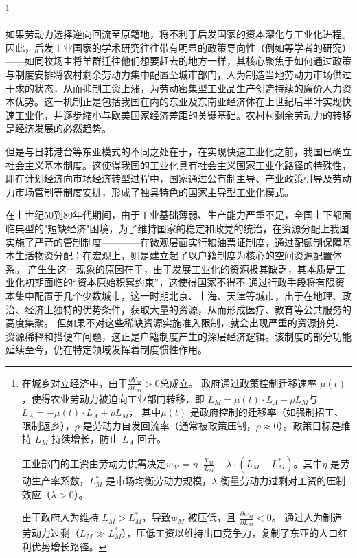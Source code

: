 \documentclass[a4paper, zihao=-4, fontset = mac, oneside]{ctexbook} %
\let\oldfootnote\footnote
\renewcommand{\footnote}[1]{%
  \oldfootnote{\setstretch{1.5}#1}%
}
\begin{document}
\footnote{
  在城乡对立经济中，由于\(\frac{\partial Y_M}{\partial L_M}>0\)总成立。
  政府通过政策控制迁移速率 \( \mu(t) \)，使得农业劳动力被迫向工业部门转移，即
  \(\dot{L}_M = \mu(t) \cdot L_A - \rho L_M\)与\(\dot{L}_A = -\mu(t) \cdot L_A + \rho L_M\)，
  其中\( \mu(t) \) 是政府控制的迁移率（如强制招工、限制返乡），\( \rho \) 是劳动力自发回流率（通常被政策压制，\( \rho \approx 0 \)）。政策目标是维持 \( L_M \) 持续增长，防止 \( L_A \) 回升。

  工业部门的工资由劳动力供需决定\(w_M = \eta \cdot \frac{Y_M}{L_M}  - \lambda \cdot (L_M - L_M^*)\)。其中\( \eta \) 是劳动生产率系数，\( L_M^* \) 是市场均衡劳动力规模，\( \lambda \) 衡量劳动力过剩对工资的压制效应（\( \lambda > 0 \)）。

  由于政府人为维持 \( L_M > L_M^* \)，导致\(w_M \text{ 被压低，且 } \frac{\partial w_M}{\partial L_M} < 0\)。
  通过人为制造劳动力过剩（\( L_M \gg L_M^* \)），压低工资以维持出口竞争力，复制了东亚的人口红利优势增长路径。
}
如果劳动力选择逆向回流至原籍地，将不利于后发国家的资本深化与工业化进程。
因此，后发工业国家的学术研究往往带有明显的政策导向性（例如\textcite{QuanZhuoWeiWoGuoNongCunShengYuLaoDongLiZhuanYiDeYanJiu1996}等学者的研究）——如同牧场主将羊群迁往他们想要赶去的地方一样，其核心聚焦于如何通过政策与制度安排将农村剩余劳动力集中配置至城市部门，人为制造当地劳动力市场供过于求的状态，从而抑制工资上涨，为劳动密集型工业品生产创造持续的廉价人力资本优势。这一机制正是包括我国在内的东亚及东南亚经济体在上世纪后半叶实现快速工业化，并逐步缩小与欧美国家经济差距的关键基础。农村村剩余劳动力的转移是经济发展的必然趋势。

但是与日韩港台等东亚模式的不同之处在于，在实现快速工业化之前，我国已确立社会主义基本制度。这使得我国的工业化具有社会主义国家工业化路径的特殊性，即在计划经济向市场经济转型过程中，国家通过公有制主导、产业政策引导及劳动力市场管制等制度安排，形成了独具特色的国家主导型工业化模式。

在上世纪50到80年代期间，由于工业基础薄弱、生产能力严重不足，全国上下都面临典型的"短缺经济"困境，为了维持国家的稳定和政党的统治，在资源分配上我国实施了严苛的管制制度————在微观层面实行粮油票证制度，通过配额制保障基本生活物资分配；在宏观上，则是建立起了以户籍制度为核心的空间资源配置体系。
产生生这一现象的原因在于，由于发展工业化的资源极其缺乏，其本质是工业化初期面临的“资本原始积累约束”，这使得国家不得不
通过行政手段将有限资本集中配置于几个少数城市，这一时期北京、上海、天津等城市，出于在地理、政治、经济上独特的优势条件，获取大量的资源，从而形成医疗、教育等公共服务的高度集聚。
但如果不对这些稀缺资源实施准入限制，就会出现严重的资源挤兑、资源稀释和搭便车问题，这正是户籍制度产生的深层经济逻辑。该制度的部分功能延续至今，仍在特定领域发挥着制度惯性作用。
\end{document}
